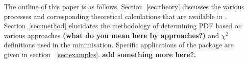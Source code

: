 The outline of this paper is as follows.
%
Section~\ref{sec:theory} discusses the various processes 
and corresponding theoretical calculations 
that are available in \fitter.
%
Section~\ref{sec:method} elucidates the 
methodology of determining PDF based on various approaches {\bf (what do you mean here
by approaches?)} and $\chi^2$ definitions used in the
minimisation.
%
Specific applications of the package are given in
section ~\ref{sec:examples}. 
%
{\bf add something more here?.}
